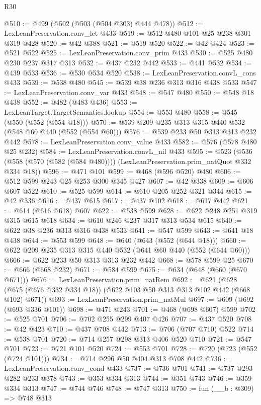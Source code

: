 \begin{lexlean}{R30}
\begin{coremodule}
@510 := @499 (@502 (@503 (@504 @303) @444 @478))
@512 := LexLeanPreservation.conv_let @433
@519 := @512 @480 @101 @25 @238 @301 @319 @428
@520 := @42 @388
@521 := @519 @520
@522 := @42 @424
@523 := @521 @522
@525 := LexLeanPreservation.conv_prim @433
@530 := @525 @480 @230 @237 @317 @313
@532 := @437 @232 @442
@533 := @441 @532
@534 := @439 @533
@536 := @530 @534 @520
@538 := LexLeanPreservation.convL_cons @433
@539 := @538 @480
@545 := @539 @38 @236 @313 @316 @438 @533
@547 := LexLeanPreservation.conv_var @433
@548 := @547 @480
@550 := @548 @18 @438
@552 := @482 (@483 @436)
@553 := LexLeanTarget.TargetSemantics.lookup
@554 := @553 @480
@558 := @545 (@550 (@552 (@554 @18)))
@570 := @539 @209 @235 @313 @315 @440 @532 (@548 @60 @440 (@552 (@554 @60)))
@576 := @539 @233 @50 @313 @313 @232 @442
@578 := LexLeanPreservation.conv_value @433
@582 := @576 (@578 @480 @25 @232)
@584 := LexLeanPreservation.convL_nil @433
@595 := @523
    (@536 (@558 (@570 (@582 (@584 @480)))) (LexLeanPreservation.prim_natQuot @332 @334 @18))
@596 := @471 @101
@599 := @468 (@596 @520) @480
@606 := @512 @599 @243 @25 @253 @300 @345 @427
@607 := @42 @338
@609 := @606 @607 @522
@610 := @525 @599
@614 := @610 @205 @252 @321 @344
@615 := @42 @336
@616 := @437 @615
@617 := @437 @102
@618 := @617 @442
@621 := @614 (@616 @618) @607
@622 := @538 @599
@628 := @622 @248 @251 @319 @315 @615 @618
@634 := @610 @246 @237 @317 @313 @534 @615
@640 := @622 @38 @236 @313 @316 @438 @533
@641 := @547 @599
@643 := @641 @18 @438
@644 := @553 @599
@648 := @640 (@643 (@552 (@644 @18)))
@660 := @622 @209 @235 @313 @315 @440 @532 (@641 @60 @440 (@552 (@644 @60)))
@666 := @622 @233 @50 @313 @313 @232 @442
@668 := @578 @599 @25
@670 := @666 (@668 @232)
@671 := @584 @599
@675 := @634 (@648 (@660 (@670 @671)))
@676 := LexLeanPreservation.prim_natRem
@692 := @621 (@628 (@675 (@676 @332 @334 @18)) (@622 @103 @50 @313 @313 @102 @442 (@668 @102) @671))
@693 := LexLeanPreservation.prim_natMul
@697 := @609 (@692 (@693 @336 @101))
@698 := @471 @243
@701 := @468 (@698 @607) @599
@702 := @525 @701
@706 := @702 @255 @299 @407 @426
@707 := @437 @520
@708 := @42 @423
@710 := @437 @708 @442
@713 := @706 (@707 @710) @522
@714 := @538 @701
@720 := @714 @257 @298 @313 @406 @520 @710
@721 := @547 @701
@723 := @721 @101 @520
@724 := @553 @701
@728 := @720 (@723 (@552 (@724 @101)))
@734 := @714 @296 @50 @404 @313 @708 @442
@736 := LexLeanPreservation.conv_cond @433
@737 := @736 @701
@741 := @737 @293 @282 @233 @378
@743 := @353 @334 @313
@744 := @351 @743
@746 := @359 @334 @313
@747 := @744 @746
@748 := @747 @313
@750 := fun (__b : @309) => @748 @313

\end{coremodule}
\end{lexlean}
